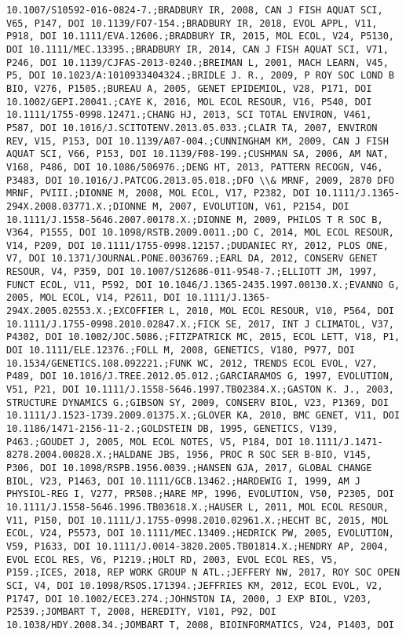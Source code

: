 \documentclass[]{article}
\begin{document}
\begin{verbatim}
10.1007/S10592-016-0824-7.;BRADBURY IR, 2008, CAN J FISH AQUAT SCI, V65, P147, DOI 10.1139/FO7-154.;BRADBURY IR, 2018, EVOL APPL, V11, P918, DOI 10.1111/EVA.12606.;BRADBURY IR, 2015, MOL ECOL, V24, P5130, DOI 10.1111/MEC.13395.;BRADBURY IR, 2014, CAN J FISH AQUAT SCI, V71, P246, DOI 10.1139/CJFAS-2013-0240.;BREIMAN L, 2001, MACH LEARN, V45, P5, DOI 10.1023/A:1010933404324.;BRIDLE J. R., 2009, P ROY SOC LOND B BIO, V276, P1505.;BUREAU A, 2005, GENET EPIDEMIOL, V28, P171, DOI 10.1002/GEPI.20041.;CAYE K, 2016, MOL ECOL RESOUR, V16, P540, DOI 10.1111/1755-0998.12471.;CHANG HJ, 2013, SCI TOTAL ENVIRON, V461, P587, DOI 10.1016/J.SCITOTENV.2013.05.033.;CLAIR TA, 2007, ENVIRON REV, V15, P153, DOI 10.1139/A07-004.;CUNNINGHAM KM, 2009, CAN J FISH AQUAT SCI, V66, P153, DOI 10.1139/F08-199.;CUSHMAN SA, 2006, AM NAT, V168, P486, DOI 10.1086/506976.;DENG HT, 2013, PATTERN RECOGN, V46, P3483, DOI 10.1016/J.PATCOG.2013.05.018.;DFO \\& MRNF, 2009, 2870 DFO MRNF, PVIII.;DIONNE M, 2008, MOL ECOL, V17, P2382, DOI 10.1111/J.1365-294X.2008.03771.X.;DIONNE M, 2007, EVOLUTION, V61, P2154, DOI 10.1111/J.1558-5646.2007.00178.X.;DIONNE M, 2009, PHILOS T R SOC B, V364, P1555, DOI 10.1098/RSTB.2009.0011.;DO C, 2014, MOL ECOL RESOUR, V14, P209, DOI 10.1111/1755-0998.12157.;DUDANIEC RY, 2012, PLOS ONE, V7, DOI 10.1371/JOURNAL.PONE.0036769.;EARL DA, 2012, CONSERV GENET RESOUR, V4, P359, DOI 10.1007/S12686-011-9548-7.;ELLIOTT JM, 1997, FUNCT ECOL, V11, P592, DOI 10.1046/J.1365-2435.1997.00130.X.;EVANNO G, 2005, MOL ECOL, V14, P2611, DOI 10.1111/J.1365-294X.2005.02553.X.;EXCOFFIER L, 2010, MOL ECOL RESOUR, V10, P564, DOI 10.1111/J.1755-0998.2010.02847.X.;FICK SE, 2017, INT J CLIMATOL, V37, P4302, DOI 10.1002/JOC.5086.;FITZPATRICK MC, 2015, ECOL LETT, V18, P1, DOI 10.1111/ELE.12376.;FOLL M, 2008, GENETICS, V180, P977, DOI 10.1534/GENETICS.108.092221.;FUNK WC, 2012, TRENDS ECOL EVOL, V27, P489, DOI 10.1016/J.TREE.2012.05.012.;GARCIARAMOS G, 1997, EVOLUTION, V51, P21, DOI 10.1111/J.1558-5646.1997.TB02384.X.;GASTON K. J., 2003, STRUCTURE DYNAMICS G.;GIBSON SY, 2009, CONSERV BIOL, V23, P1369, DOI 10.1111/J.1523-1739.2009.01375.X.;GLOVER KA, 2010, BMC GENET, V11, DOI 10.1186/1471-2156-11-2.;GOLDSTEIN DB, 1995, GENETICS, V139, P463.;GOUDET J, 2005, MOL ECOL NOTES, V5, P184, DOI 10.1111/J.1471-8278.2004.00828.X.;HALDANE JBS, 1956, PROC R SOC SER B-BIO, V145, P306, DOI 10.1098/RSPB.1956.0039.;HANSEN GJA, 2017, GLOBAL CHANGE BIOL, V23, P1463, DOI 10.1111/GCB.13462.;HARDEWIG I, 1999, AM J PHYSIOL-REG I, V277, PR508.;HARE MP, 1996, EVOLUTION, V50, P2305, DOI 10.1111/J.1558-5646.1996.TB03618.X.;HAUSER L, 2011, MOL ECOL RESOUR, V11, P150, DOI 10.1111/J.1755-0998.2010.02961.X.;HECHT BC, 2015, MOL ECOL, V24, P5573, DOI 10.1111/MEC.13409.;HEDRICK PW, 2005, EVOLUTION, V59, P1633, DOI 10.1111/J.0014-3820.2005.TB01814.X.;HENDRY AP, 2004, EVOL ECOL RES, V6, P1219.;HOLT RD, 2003, EVOL ECOL RES, V5, P159.;ICES, 2018, REP WORK GROUP N ATL.;JEFFERY NW, 2017, ROY SOC OPEN SCI, V4, DOI 10.1098/RSOS.171394.;JEFFRIES KM, 2012, ECOL EVOL, V2, P1747, DOI 10.1002/ECE3.274.;JOHNSTON IA, 2000, J EXP BIOL, V203, P2539.;JOMBART T, 2008, HEREDITY, V101, P92, DOI 10.1038/HDY.2008.34.;JOMBART T, 2008, BIOINFORMATICS, V24, P1403, DOI 
\end{verbatim}
\end{document}
